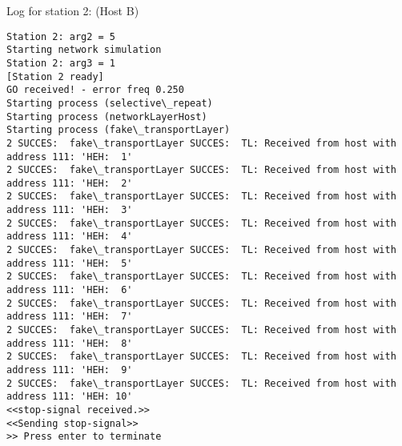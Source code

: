 Log for station 2: (Host B)
\begin{lstlisting}[breaklines=true]
Station 2: arg2 = 5
Starting network simulation
Station 2: arg3 = 1
[Station 2 ready]
GO received! - error freq 0.250
Starting process (selective\_repeat)
Starting process (networkLayerHost)
Starting process (fake\_transportLayer)
2 SUCCES:  fake\_transportLayer SUCCES:  TL: Received from host with address 111: 'HEH:  1'
2 SUCCES:  fake\_transportLayer SUCCES:  TL: Received from host with address 111: 'HEH:  2'
2 SUCCES:  fake\_transportLayer SUCCES:  TL: Received from host with address 111: 'HEH:  3'
2 SUCCES:  fake\_transportLayer SUCCES:  TL: Received from host with address 111: 'HEH:  4'
2 SUCCES:  fake\_transportLayer SUCCES:  TL: Received from host with address 111: 'HEH:  5'
2 SUCCES:  fake\_transportLayer SUCCES:  TL: Received from host with address 111: 'HEH:  6'
2 SUCCES:  fake\_transportLayer SUCCES:  TL: Received from host with address 111: 'HEH:  7'
2 SUCCES:  fake\_transportLayer SUCCES:  TL: Received from host with address 111: 'HEH:  8'
2 SUCCES:  fake\_transportLayer SUCCES:  TL: Received from host with address 111: 'HEH:  9'
2 SUCCES:  fake\_transportLayer SUCCES:  TL: Received from host with address 111: 'HEH: 10'
<<stop-signal received.>>
<<Sending stop-signal>>
>> Press enter to terminate
\end{lstlisting}

